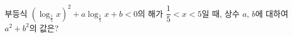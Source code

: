 부등식 $\left(\log_{\frac{1}{5}}x\right)^{2}+a\log_{\frac{1}{5}}x+b<0$의 해가 $\dfrac{1}{5}<x<5$일 때, 상수 $a$, $b$에 대하여 $a^{2}+b^{2}$의 값은?
